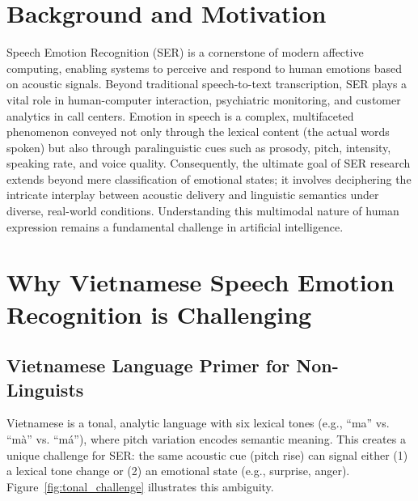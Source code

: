 \documentclass[12pt,a4paper]{report}
\begin{document}
\section{Background and Motivation}
Speech Emotion Recognition (SER) is a cornerstone of modern affective computing, enabling systems to perceive and respond to human emotions based on acoustic signals. Beyond traditional speech-to-text transcription, SER plays a vital role in human-computer interaction, psychiatric monitoring, and customer analytics in call centers. Emotion in speech is a complex, multifaceted phenomenon conveyed not only through the lexical content (the actual words spoken) but also through paralinguistic cues such as prosody, pitch, intensity, speaking rate, and voice quality. Consequently, the ultimate goal of SER research extends beyond mere classification of emotional states; it involves deciphering the intricate interplay between acoustic delivery and linguistic semantics under diverse, real-world conditions. Understanding this multimodal nature of human expression remains a fundamental challenge in artificial intelligence.

\section{Why Vietnamese Speech Emotion Recognition is Challenging}

\subsection{Vietnamese Language Primer for Non-Linguists}
Vietnamese is a tonal, analytic language with six lexical tones (e.g., ``ma'' vs. 
``mà'' vs. ``má''), where pitch variation encodes semantic meaning. This creates 
a unique challenge for SER: the same acoustic cue (pitch rise) can signal either 
(1) a lexical tone change or (2) an emotional state (e.g., surprise, anger). 
Figure~\ref{fig:tonal_challenge} illustrates this ambiguity.
\end{document}
